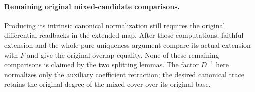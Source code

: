\paragraph{Remaining original mixed-candidate comparisons.}
Producing its intrinsic
canonical normalization still requires the original differential
readbacks in the extended map.  After those computations, faithful
extension and the whole-pure uniqueness argument compare its actual
extension with $F$ and give the original overlap equality.  None of
these remaining comparisons is claimed by the two splitting lemmas.
The factor $D^{-1}$ here normalizes only the auxiliary coefficient
retraction; the desired canonical trace retains the original degree
of the mixed cover over its original base.
